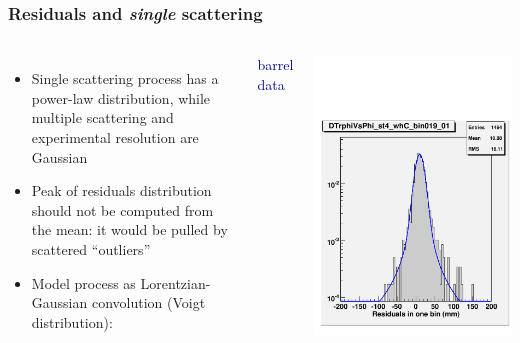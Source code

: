 \documentclass[compress]{beamer}
\begin{document}
\begin{frame}
\frametitle{Residuals and {\it single} scattering}

\begin{columns}

\begin{itemize}
\item Single scattering process has a power-law distribution, while multiple scattering and experimental resolution are Gaussian

\item Peak of residuals distribution should not be computed from
  the mean: it would be pulled by scattered ``outliers''

\item Model process as Lorentzian-Gaussian convolution (Voigt distribution):
\end{itemize}
\tiny \textcolor{darkblue}{barrel data}

\includegraphics[width=\linewidth]{fitfunction.pdf}
\end{columns}


\end{frame}
\end{document}
